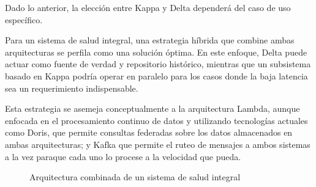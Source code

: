 Dado lo anterior, la elección entre Kappa y Delta dependerá del caso de uso específico.

\newpage

Para un sistema de salud integral, una estrategia híbrida que combine ambas arquitecturas se perfila como una solución óptima. 
En este enfoque, Delta puede actuar como fuente de verdad y repositorio histórico, 
mientras que un subsistema basado en Kappa podría operar en paralelo para los casos donde la baja latencia sea un requerimiento indispensable. \newline

Esta estrategia se asemeja conceptualmente a la arquitectura Lambda, 
aunque enfocada en el procesamiento continuo de datos y utilizando tecnologías actuales como Doris, 
que permite consultas federadas sobre los datos almacenados en ambas arquitecturas; 
y Kafka que permite el ruteo de mensajes a ambos sistemas a la vez paraque cada uno lo procese a la velocidad que pueda.

\begin{figure}[h]
    \caption{Arquitectura combinada de un sistema de salud integral} 
    \label{fig:des_arquitectura_combinada}
\end{figure}